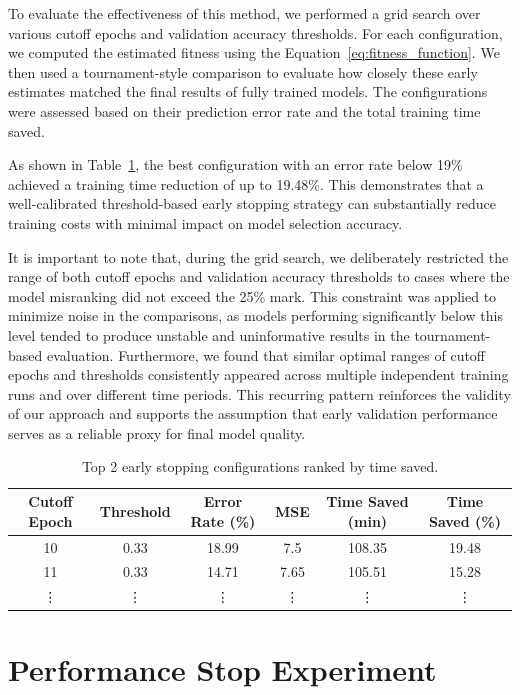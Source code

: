 To evaluate the effectiveness of this method, we performed a grid search over various cutoff epochs and validation accuracy thresholds. For each configuration, we computed the estimated fitness using the Equation~\ref{eq:fitness_function}. We then used a tournament-style comparison to evaluate how closely these early estimates matched the final results of fully trained models. The configurations were assessed based on their prediction error rate and the total training time saved.

As shown in Table~\ref{tab:early_stopping_results}, the best configuration with an error rate below 19\% achieved a training time reduction of up to 19.48\%. This demonstrates that a well-calibrated threshold-based early stopping strategy can substantially reduce training costs with minimal impact on model selection accuracy.

It is important to note that, during the grid search, we deliberately restricted the range of both cutoff epochs and validation accuracy thresholds to cases where the model misranking did not exceed the 25\% mark. This constraint was applied to minimize noise in the comparisons, as models performing significantly below this level tended to produce unstable and uninformative results in the tournament-based evaluation. Furthermore, we found that similar optimal ranges of cutoff epochs and thresholds consistently appeared across multiple independent training runs and over different time periods. This recurring pattern reinforces the validity of our approach and supports the assumption that early validation performance serves as a reliable proxy for final model quality.


\begin{table}[ht]
\centering
\begin{tabular}{cccccc}
\toprule
Cutoff Epoch & Threshold & Error Rate (\%) & MSE & Time Saved (min) & Time Saved (\%) \\
\midrule
10  & 0.33 & 18.99 & 7.5 & 108.35 & 19.48 \\
11  & 0.33 & 14.71 & 7.65 & 105.51 & 15.28 \\
\vdots & \vdots & \vdots & \vdots & \vdots & \vdots \\
\bottomrule
\end{tabular}
\caption{Top 2 early stopping configurations ranked by time saved.}
\label{tab:early_stopping_results}
\end{table}




\section{Performance Stop Experiment}

